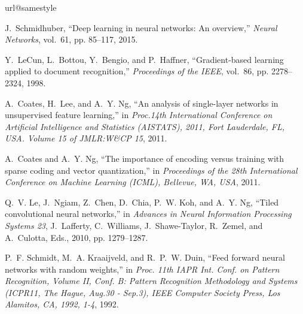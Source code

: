 \documentclass[conference]{IEEEtran}
\begin{document}
\begin{thebibliography}{10}
\providecommand{\url}[1]{#1}
\csname url@samestyle\endcsname
\providecommand{\newblock}{\relax}
\providecommand{\bibinfo}[2]{#2}
\providecommand{\BIBentrySTDinterwordspacing}{\spaceskip=0pt\relax}
\providecommand{\BIBentryALTinterwordstretchfactor}{4}
\providecommand{\BIBentryALTinterwordspacing}{\spaceskip=\fontdimen2\font plus
\BIBentryALTinterwordstretchfactor\fontdimen3\font minus
  \fontdimen4\font\relax}
\providecommand{\BIBforeignlanguage}[2]{{\expandafter\ifx\csname l@#1\endcsname\relax
\typeout{** WARNING: IEEEtran.bst: No hyphenation pattern has been}\typeout{** loaded for the language `#1'. Using the pattern for}\typeout{** the default language instead.}\else
\language=\csname l@#1\endcsname
\fi
#2}}
\providecommand{\BIBdecl}{\relax}
\BIBdecl

J.~Schmidhuber, ``Deep learning in neural networks: {A}n overview,''
  \emph{Neural Networks}, vol.~61, pp. 85--117, 2015.

Y.~LeCun, L.~Bottou, Y.~Bengio, and P.~Haffner, ``Gradient-based learning
  applied to document recognition,'' \emph{Proceedings of the IEEE}, vol.~86,
  pp. 2278--2324, 1998.

A.~Coates, H.~Lee, and A.~Y. Ng, ``An analysis of single-layer networks in
  unsupervised feature learning,'' in \emph{Proc.14th International Conference
  on Artificial Intelligence and Statistics (AISTATS), 2011, Fort Lauderdale,
  FL, USA. Volume 15 of JMLR:W\&CP 15}, 2011.

A.~Coates and A.~Y. Ng, ``The importance of encoding versus training with
  sparse coding and vector quantization,'' in \emph{Proceedings of the 28th
  International Conference on Machine Learning (ICML), Bellevue, WA, USA},
  2011.

Q.~V. Le, J.~Ngiam, Z.~Chen, D.~Chia, P.~W. Koh, and A.~Y. Ng, ``Tiled
  convolutional neural networks,'' in \emph{Advances in Neural Information
  Processing Systems 23}, J.~Lafferty, C.~Williams, J.~Shawe-Taylor, R.~Zemel,
  and A.~Culotta, Eds., 2010, pp. 1279--1287.

P.~F. Schmidt, M.~A. Kraaijveld, and R.~P.~W. Duin, ``Feed forward neural
  networks with random weights,'' in \emph{Proc. 11th IAPR Int. Conf. on
  Pattern Recognition, Volume II, Conf. B: Pattern Recognition Methodology and
  Systems (ICPR11, The Hague, Aug.30 - Sep.3), IEEE Computer Society Press, Los
  Alamitos, CA, 1992, 1-4}, 1992.


\end{thebibliography}
\end{document}
